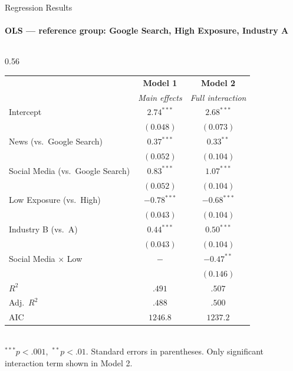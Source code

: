 \documentclass[aspectratio=169, 10pt]{beamer}
\begin{document}
\begin{frame}{Regression Results}
  \framesubtitle{OLS — reference group: Google Search, High Exposure, Industry A}
  \begin{columns}[T]
    \begin{column}{0.56\textwidth}
      {\scriptsize
      \renewcommand{\arraystretch}{1.05}
      \begin{tabular}{lcc}
        \toprule
        & \textbf{Model 1} & \textbf{Model 2} \\
        & \textit{Main effects} & \textit{Full interaction} \\
        \midrule
        Intercept
          & $2.74^{***}$ & $2.68^{***}$ \\
          & \textcolor{pgray}{$(0.048)$} & \textcolor{pgray}{$(0.073)$} \\[0.3em]
        News (vs.\ Google Search)
          & $0.37^{***}$ & $0.33^{**}$ \\
          & \textcolor{pgray}{$(0.052)$} & \textcolor{pgray}{$(0.104)$} \\[0.3em]
        Social Media (vs.\ Google Search)
          & $0.83^{***}$ & $1.07^{***}$ \\
          & \textcolor{pgray}{$(0.052)$} & \textcolor{pgray}{$(0.104)$} \\[0.3em]
        Low Exposure (vs.\ High)
          & $-0.78^{***}$ & $-0.68^{***}$ \\
          & \textcolor{pgray}{$(0.043)$} & \textcolor{pgray}{$(0.104)$} \\[0.3em]
        Industry B (vs.\ A)
          & $0.44^{***}$ & $0.50^{***}$ \\
          & \textcolor{pgray}{$(0.043)$} & \textcolor{pgray}{$(0.104)$} \\[0.3em]
        Social Media $\times$ Low
          & $-$ & $-0.47^{**}$ \\
          & & \textcolor{pgray}{$(0.146)$} \\
        \midrule
        $R^2$ & $.491$ & $.507$ \\
        Adj.\ $R^2$ & $.488$ & $.500$ \\
        AIC & $1246.8$ & $1237.2$ \\
        \bottomrule
      \end{tabular}
      }\\[0.3em]
      {\tiny\textcolor{pgray}{$^{***}p<.001$,\ $^{**}p<.01$. Standard errors in parentheses. Only significant interaction term shown in Model 2.}}

\end{column}
\end{columns}
\end{frame}
\end{document}
